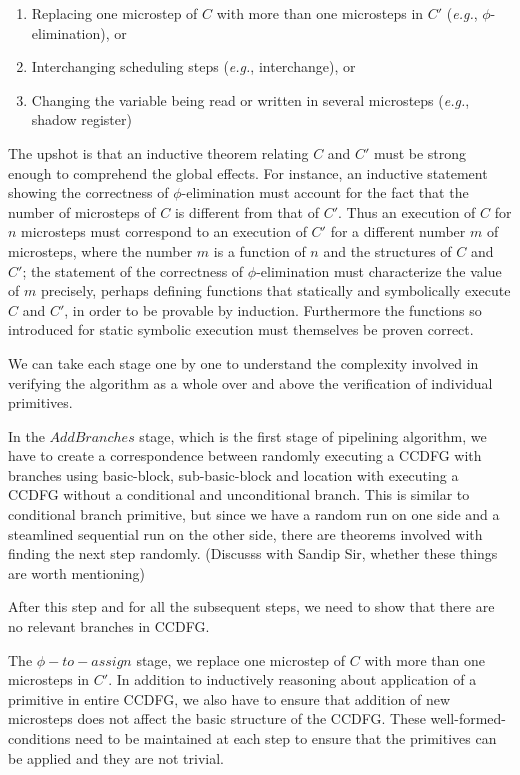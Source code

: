 \begin{enumerate}
\item Replacing one microstep of $C$ with more than one
  microsteps in $C'$ ({\em e.g.}, $\phi$-elimination), or
\item Interchanging scheduling steps ({\em e.g.},
  interchange), or
\item Changing the variable being read or written in several
  microsteps ({\em e.g.}, shadow register)
\end{enumerate}
The upshot is that an inductive theorem relating $C$ and
$C'$ must be strong enough to comprehend the global effects.
For instance, an inductive statement showing the
correctness of $\phi$-elimination must account for the fact
that the number of microsteps of $C$ is different from that
of $C'$.  Thus an execution of $C$ for $n$ microsteps must
correspond to an execution of $C'$ for a different number
$m$ of microsteps, where the number $m$ is a function of $n$
and the structures of $C$ and $C'$; the statement of the
correctness of $\phi$-elimination must characterize the
value of $m$ precisely, perhaps defining functions that
statically and symbolically execute $C$ and $C'$, in order
to be provable by induction.  Furthermore the functions so
introduced for static symbolic execution must themselves be
proven correct.

We can take each stage one by one to understand the complexity involved in 
verifying the algorithm as a whole over and above the verification of 
individual primitives. 

In the $AddBranches$ stage, which is the first stage of pipelining algorithm, we 
have to create a correspondence between randomly executing a CCDFG with branches 
using basic-block, sub-basic-block and location with executing a CCDFG without 
a conditional and unconditional branch. This is similar to conditional branch primitive, but since 
we have a random run on one side and a steamlined sequential run on the other side, 
there are theorems involved with finding the next step randomly. (Discusss with Sandip Sir, whether these things are worth mentioning)

After this step and for all the subsequent steps, we need to show that there are no relevant branches in CCDFG.

The $\phi-to-assign$ stage, we replace one microstep of $C$ with more than one microsteps in $C'$. 
In addition to inductively reasoning about application of a primitive in entire CCDFG, we also have to ensure
that addition of new microsteps does not affect the basic structure of the CCDFG. These well-formed-conditions
need to be maintained at each step to ensure that the primitives can be applied and they are not trivial.

